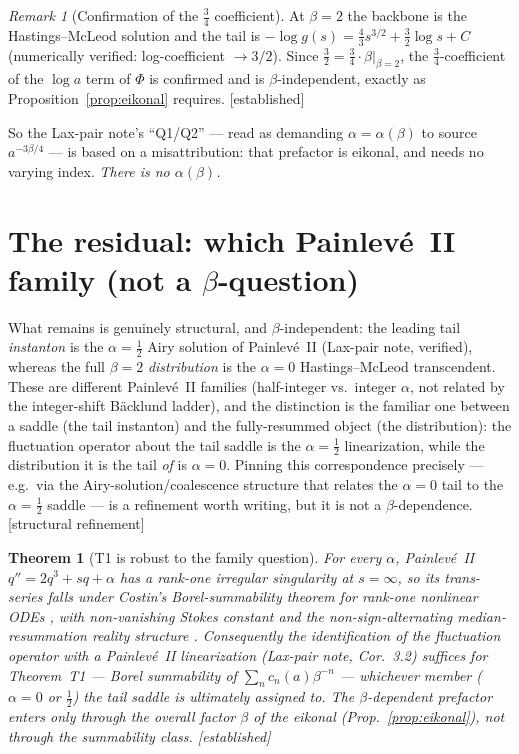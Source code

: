 \documentclass[11pt,reqno]{amsart}
\theoremstyle{plain}
\newtheorem{theorem}[proposition]{Theorem}
\theoremstyle{remark}
\newtheorem{remark}[proposition]{Remark}
\newcommand{\OK}{{\footnotesize\textsf{[established]}}}
\newcommand{\gap}{{\footnotesize\textsf{[structural refinement]}}}
\begin{document}
\begin{remark}[Confirmation of the $\tfrac34$ coefficient]\label{rem:confirm}
At $\beta=2$ the backbone is the Hastings--McLeod solution and the tail is
$-\log g(s)=\tfrac43 s^{3/2}+\tfrac32\log s+C$ (numerically verified: log-coefficient
$\to 3/2$). Since $\tfrac32=\tfrac34\cdot\beta|_{\beta=2}$, the $\tfrac34$-coefficient of the
$\log a$ term of $\Phi$ is confirmed and is $\beta$-independent, exactly as
Proposition~\ref{prop:eikonal} requires. \OK
\end{remark}

So the Lax-pair note's ``Q1/Q2'' --- read as demanding $\alpha=\alpha(\beta)$ to source
$a^{-3\beta/4}$ --- is based on a misattribution: that prefactor is eikonal, and needs no varying
index. \emph{There is no $\alpha(\beta)$.}

\section{The residual: which Painlev\'e~II family (not a $\beta$-question)}

What remains is genuinely structural, and $\beta$-independent: the leading tail \emph{instanton}
is the $\alpha=\tfrac12$ Airy solution of Painlev\'e~II (Lax-pair note, verified), whereas the full
$\beta=2$ \emph{distribution} is the $\alpha=0$ Hastings--McLeod transcendent. These are different
Painlev\'e~II families (half-integer vs.\ integer $\alpha$, not related by the integer-shift
B\"acklund ladder), and the distinction is the familiar one between a saddle (the tail instanton)
and the fully-resummed object (the distribution): the fluctuation operator about the tail saddle is
the $\alpha=\tfrac12$ linearization, while the distribution it is the tail \emph{of} is $\alpha=0$.
Pinning this correspondence precisely --- e.g.\ via the Airy-solution/coalescence structure that
relates the $\alpha=0$ tail to the $\alpha=\tfrac12$ saddle --- is a refinement worth writing, but
it is not a $\beta$-dependence. \gap

\begin{theorem}[T1 is robust to the family question]\label{thm:robust}
For \emph{every} $\alpha$, Painlev\'e~II $q''=2q^3+sq+\alpha$ has a rank-one irregular singularity
at $s=\infty$, so its trans-series falls under Costin's Borel-summability theorem for rank-one
nonlinear ODEs \cite{Costin}, with non-vanishing Stokes constant \cite{CCK} and the
non-sign-alternating median-resummation reality structure \cite{CleriDunne}. Consequently the
identification of the fluctuation operator with a Painlev\'e~II linearization (Lax-pair note,
Cor.~3.2) suffices for Theorem~T1 --- Borel summability of $\sum_n c_n(a)\beta^{-n}$ --- \emph{whichever}
member ($\alpha=0$ or $\tfrac12$) the tail saddle is ultimately assigned to. The
$\beta$-dependent prefactor enters only through the overall factor $\beta$ of the eikonal
(Prop.~\ref{prop:eikonal}), not through the summability class. \OK
\end{theorem}
\end{document}
